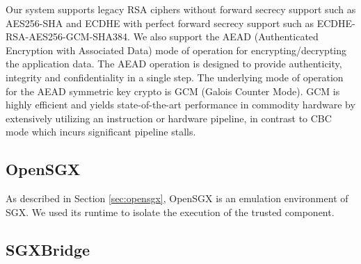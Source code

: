 \documentclass[../main.tex]{subfiles}
\begin{document}
Our system supports legacy RSA ciphers without forward secrecy support such as
AES256-SHA and ECDHE with perfect forward secrecy support such as
ECDHE-RSA-AES256-GCM-SHA384. We also support the AEAD (Authenticated Encryption
with Associated Data) mode of operation for encrypting/decrypting the
application data. The AEAD operation is designed to provide authenticity,
integrity and confidentiality in a single step. The underlying mode of
operation for the AEAD symmetric key crypto is GCM (Galois
Counter Mode). GCM is highly efficient and yields state-of-the-art performance
in commodity hardware by extensively utilizing an instruction or hardware
pipeline, in contrast to CBC mode which incurs significant pipeline stalls.

\subsection{OpenSGX}
\label{subsec:opensgx}
As described in Section \ref{sec:opensgx}, OpenSGX is an emulation environment
of \Intel SGX. We used its runtime to isolate the execution of the trusted
component.


%


\subsection{SGXBridge}
\label{subsec:sgxbridge}
\end{document}
